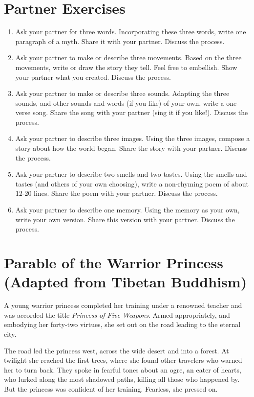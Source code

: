 \documentclass[letterpaper,oneside]{memoir}
\begin{document}
\begin{description}
\section{Partner Exercises}
\begin{enumerate}
\item Ask your partner for three words. Incorporating these three words, write one paragraph of a myth. Share it with your partner. Discuss the process.
\item Ask your partner to make or describe three movements. Based on the three movements, write or draw the story they tell. Feel free to embellish. Show your partner what you created. Discuss the process.
\item Ask your partner to make or describe three sounds. Adapting the three sounds, and other sounds and words (if you like) of your own, write a one-verse song. Share the song with your partner (sing it if you like!). Discuss the process.
\item Ask your partner to describe three images. Using the three images, compose a story about how the world began. Share the story with your partner. Discuss the process.
\item Ask your partner to describe two smells and two tastes. Using the smells and tastes (and others of your own choosing), write a non-rhyming poem of about 12-20 lines. Share the poem with your partner. Discuss the process.
\item Ask your partner to describe one memory. Using the memory as your own, write your own version. Share this version with your partner. Discuss the process.
\end{enumerate}
\newpage
\section{Parable of the Warrior Princess
\\(Adapted from Tibetan Buddhism)}
A young warrior princess completed her training under a renowned teacher and was accorded the title \textit{Princess of Five Weapons}. Armed appropriately, and embodying her forty-two virtues, she set out on the road leading to the eternal city.

The road led the princess west, across the wide desert and into a forest. At twilight she reached the first trees, where she found other travelers who warned her to turn back. They spoke in fearful tones about an ogre, an eater of hearts, who lurked along the most shadowed paths, killing all those who happened by. But the princess was confident of her training. Fearless, she pressed on.


\end{description}
\end{document}
